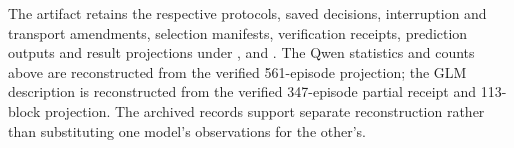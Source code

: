 The artifact retains the respective protocols, saved decisions, interruption
and transport amendments, selection manifests, verification receipts,
prediction outputs and result projections under
,
 and
. The Qwen statistics and
counts above are reconstructed from the verified 561-episode projection; the
GLM description is reconstructed from the verified 347-episode partial
receipt and 113-block projection. The archived records support separate
reconstruction rather than substituting one model's observations for the
other's.
